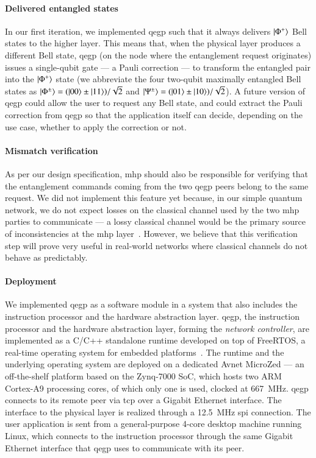 \paragraph{Delivered entangled states}

In our first iteration, we implemented \acrshort{qegp} such that it always delivers $\ket{\Phi^+}$
Bell states to the higher layer. This means that, when the physical layer produces a different Bell
state, \acrshort{qegp} (on the node where the entanglement request originates) issues a single-qubit
gate --- a Pauli correction --- to transform the entangled pair into the $\ket{\Phi^+}$ state (we
abbreviate the four two-qubit maximally entangled Bell states as $\ket{\Phi^\pm} = (\ket{00} \pm
\ket{11})/\sqrt{2}$ and $\ket{\Psi^\pm} = (\ket{01} \pm \ket{10})/\sqrt{2}$). A future version of
\acrshort{qegp} could allow the user to request any Bell state, and could extract the Pauli
correction from \acrshort{qegp} so that the application itself can decide, depending on the use
case, whether to apply the correction or not.

\paragraph{Mismatch verification}

As per our design specification, \acrshort{mhp} should also be responsible for verifying that the
entanglement commands coming from the two \acrshort{qegp} peers belong to the same request. We did
not implement this feature yet because, in our simple quantum network, we do not expect losses on
the classical channel used by the two \acrshort{mhp} parties to communicate --- a lossy classical
channel would be the primary source of inconsistencies at the \acrshort{mhp}
layer~\cite{dahlberg_2019_egp}. However, we believe that this verification step will prove very
useful in real-world networks where classical channels do not behave as predictably.

\paragraph{Deployment}

We implemented \acrshort{qegp} as a software module in a system that also includes the instruction
processor and the hardware abstraction layer. \acrshort{qegp}, the instruction processor and the
hardware abstraction layer, forming the \emph{network controller}, are implemented as a C/C++
standalone runtime developed on top of FreeRTOS, a real-time operating system for embedded
platforms~\cite{freertos}. The runtime and the underlying operating system are deployed on a
dedicated Avnet MicroZed --- an off-the-shelf platform based on the Zynq-7000 SoC, which hosts two
ARM Cortex-A9 processing cores, of which only one is used, clocked at \qty{667}{\MHz}.
\acrshort{qegp} connects to its remote peer via \acrshort{tcp} over a Gigabit Ethernet interface.
The interface to the physical layer is realized through a \qty{12.5}{\MHz} \acrshort{spi}
connection. The user application is sent from a general-purpose 4-core desktop machine running
Linux, which connects to the instruction processor through the same Gigabit Ethernet interface that
\acrshort{qegp} uses to communicate with its peer.

